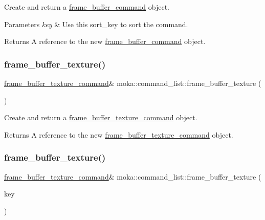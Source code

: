 Create and return a \mbox{\hyperlink{classmoka_1_1frame__buffer__command}{frame\+\_\+buffer\+\_\+command}} object. 


\begin{DoxyParams}{Parameters}
{\em key} & Use this sort\+\_\+key to sort the command. \\
\hline
\end{DoxyParams}
\begin{DoxyReturn}{Returns}
A reference to the new \mbox{\hyperlink{classmoka_1_1frame__buffer__command}{frame\+\_\+buffer\+\_\+command}} object. 
\end{DoxyReturn}
\mbox{\label{classmoka_1_1command__list_ad9cc948acc3326122e1dae789c2179cb}} 
\subsubsection{\texorpdfstring{frame\_buffer\_texture()}{frame\_buffer\_texture()}\hspace{0.1cm}{\footnotesize\ttfamily [1/2]}}
{\footnotesize\ttfamily \mbox{\hyperlink{classmoka_1_1frame__buffer__texture__command}{frame\+\_\+buffer\+\_\+texture\+\_\+command}}\& moka\+::command\+\_\+list\+::frame\+\_\+buffer\+\_\+texture (\begin{DoxyParamCaption}{ }\end{DoxyParamCaption})}



Create and return a \mbox{\hyperlink{classmoka_1_1frame__buffer__texture__command}{frame\+\_\+buffer\+\_\+texture\+\_\+command}} object. 

\begin{DoxyReturn}{Returns}
A reference to the new \mbox{\hyperlink{classmoka_1_1frame__buffer__texture__command}{frame\+\_\+buffer\+\_\+texture\+\_\+command}} object. 
\end{DoxyReturn}
\mbox{\label{classmoka_1_1command__list_aa917db260af62b8f9bdd49001627f174}} 
\subsubsection{\texorpdfstring{frame\_buffer\_texture()}{frame\_buffer\_texture()}\hspace{0.1cm}{\footnotesize\ttfamily [2/2]}}
{\footnotesize\ttfamily \mbox{\hyperlink{classmoka_1_1frame__buffer__texture__command}{frame\+\_\+buffer\+\_\+texture\+\_\+command}}\& moka\+::command\+\_\+list\+::frame\+\_\+buffer\+\_\+texture (\begin{DoxyParamCaption}\item[{\mbox{\hyperlink{namespacemoka_afa30a616e67b83113ebdb857555cf2bb}{sort\+\_\+key}}}]{key }\end{DoxyParamCaption})}



